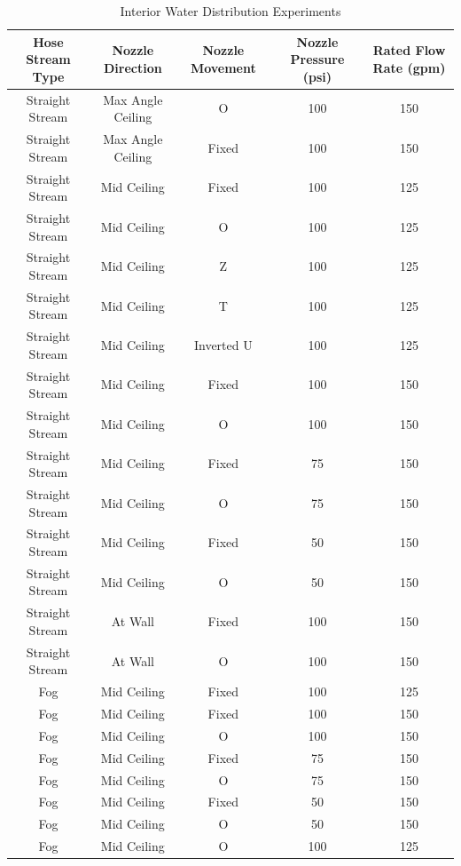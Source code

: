 \documentclass[12pt,oneside]{book}
\begin{document}
\begin{table}[!ht]
\centering
\small
\caption{Interior Water Distribution Experiments}
\label{tab:Interior_Fire_Attack_Distribution_Experiments}
\begin{tabular}{ccccc}
\toprule[1.5pt]
Hose Stream Type & Nozzle Direction & Nozzle Movement & Nozzle Pressure (psi) & Rated Flow Rate (gpm) \\ 
\midrule
Straight Stream   & Max Angle Ceiling   & O       & 100 & 150 \\
Straight Stream   & Max Angle Ceiling   & Fixed   & 100 & 150 \\
Straight Stream   & Mid Ceiling 		& Fixed   & 100 & 125 \\
Straight Stream   & Mid Ceiling 		& O       & 100 & 125 \\
Straight Stream   & Mid Ceiling 		& Z       & 100 & 125 \\
Straight Stream   & Mid Ceiling 		& T       & 100 & 125 \\
Straight Stream   & Mid Ceiling 		& Inverted U & 100 & 125 \\
Straight Stream   & Mid Ceiling 		& Fixed   & 100 & 150 \\
Straight Stream   & Mid Ceiling 		& O       & 100 & 150 \\
Straight Stream   & Mid Ceiling 		& Fixed   & 75 & 150 \\
Straight Stream   & Mid Ceiling 		& O & 75  & 150 \\
Straight Stream   & Mid Ceiling 		& Fixed   & 50 & 150 \\
Straight Stream   & Mid Ceiling 		& O & 50  & 150 \\
Straight Stream   & At Wall     		& Fixed   & 100 & 150 \\
Straight Stream   & At Wall     		& O       & 100 & 150 \\
Fog               & Mid Ceiling 		& Fixed   & 100 & 125 \\
Fog               & Mid Ceiling 		& Fixed   & 100 & 150 \\
Fog               & Mid Ceiling 		& O       & 100 & 150 \\
Fog               & Mid Ceiling 		& Fixed   & 75 & 150 \\
Fog               & Mid Ceiling 		& O & 75  & 150 \\
Fog               & Mid Ceiling 		& Fixed   & 50 & 150 \\
Fog               & Mid Ceiling 		& O & 50  & 150 \\
Fog               & Mid Ceiling 		& O       & 100 & 125 \\  

\end{tabular}
\end{table}
\end{document}
